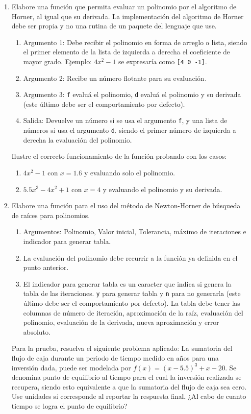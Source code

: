 \documentclass[12pt]{article}
\begin{document}
  \begin{enumerate}[leftmargin=*,widest=9]
    \item Elabore una función que permita evaluar un polinomio por el algoritmo de Horner, al igual que su derivada. La implementación del algoritmo de Horner debe ser propia y no una rutina de un paquete del lenguaje que use.
   \begin{enumerate}[label=\alph*]
    \item Argumento 1: Debe recibir el polinomio en forma de arreglo o lista, siendo el primer elemento de la lista de izquierda a derecha el coeficiente de mayor grado. Ejemplo: \(4x^2-1\) se expresaría como \verb+[4 0 -1]+.
    \item Argumento 2: Recibe un número flotante para su evaluación.
    \item Argumento 3: \verb-f- evaluá el polinomio, \verb-d- evaluá el polinomio y su derivada (este último debe ser el comportamiento por defecto).
    \item Salida: Devuelve un número si se usa el argumento \verb-f-, y una lista de números si usa el argumento \verb-d-, siendo el primer número de izquierda a derecha la evaluación del polinomio.
    \end{enumerate}
Ilustre el correcto funcionamiento de la función probando con los casos:
\begin{enumerate}[label=\roman*]
\item  \(4x^2-1\) con \(x=1.6\) y evaluando solo el polinomio.
\item \(5.5x^3 - 4x^2 + 1\) con \(x=4\) y evaluando el polinomio y su derivada.
 \end{enumerate}
    \item Elabore una función para el uso del método de Newton-Horner de búsqueda de raíces para polinomios.
    \begin{enumerate}[label=\alph*]
    \item Argumentos: Polinomio, Valor inicial, Tolerancia, máximo de iteraciones e indicador para generar tabla.
    \item La evaluación del polinomio debe recurrir a la función ya definida en el punto anterior.
	\item El indicador para generar tabla es un caracter que indica si genera la tabla de las iteraciones. \verb-y- para generar tabla y \verb-n- para no generarla (este último debe ser el comportamiento por defecto). La tabla debe tener las columnas de número de iteración, aproximación de la raíz, evaluación del polinomio, evaluación de la derivada, nueva aproximación y error absoluto.
\end{enumerate}
Para la prueba, resuelva el siguiente problema aplicado: La sumatoria del flujo de caja durante un periodo de tiempo medido en años para una inversión dada, puede ser modelada por \(f(x) = {(x-5.5)}^3 + x - 20\). Se denomina punto de equilibrio al tiempo para el cual la inversión realizada se recupera, siendo esto equivalente a que la sumatoria del flujo de caja sea cero. Use unidades si corresponde al reportar la respuesta final. ¿Al cabo de cuanto tiempo se logra el punto de equilibrio?
\end{enumerate}
\end{document}
